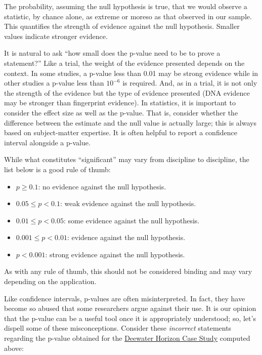 \documentclass[]{book}
\providecommand{\tightlist}{%
  \setlength{\itemsep}{0pt}\setlength{\parskip}{0pt}}
\theoremstyle{definition}
\theoremstyle{definition}
\theoremstyle{remark}
\let\BeginKnitrBlock\begin \let\EndKnitrBlock\end
\begin{document}
\BeginKnitrBlock{definition}[P-Value]
\protect\hypertarget{def:defn-pvalue}{}{\label{def:defn-pvalue}
{} }The probability, assuming the null hypothesis
is true, that we would observe a statistic, by chance alone, as extreme
or moreso as that observed in our sample. This quantifies the strength
of evidence against the null hypothesis. Smaller values indicate
stronger evidence.
\EndKnitrBlock{definition}

It is natural to ask ``how small does the p-value need to be to prove a
statement?'' Like a trial, the weight of the evidence presented depends
on the context. In some studies, a p-value less than 0.01 may be strong
evidence while in other studies a p-value less than \(10^{-6}\) is
required. And, as in a trial, it is not only the strength of the
evidence but the type of evidence presented (DNA evidence may be
stronger than fingerprint evidence). In statistics, it is important to
consider the effect size as well as the p-value. That is, consider
whether the difference between the estimate and the null value is
actually large; this is always based on subject-matter expertise. It is
often helpful to report a confidence interval alongside a p-value.

\BeginKnitrBlock{rmdtip}
While what constitutes ``significant'' may vary from discipline to
discipline, the list below is a good rule of thumb:

\begin{itemize}
\tightlist
\item
  \(p \geq 0.1\): no evidence against the null hypothesis.
\item
  \(0.05 \leq p < 0.1\): weak evidence against the null hypothesis.
\item
  \(0.01 \leq p < 0.05\): some evidence against the null hypothesis.
\item
  \(0.001 \leq p < 0.01\): evidence against the null hypothesis.
\item
  \(p < 0.001\): strong evidence against the null hypothesis.
\end{itemize}

As with any rule of thumb, this should not be considered binding and may
vary depending on the application.
\EndKnitrBlock{rmdtip}

Like confidence intervals, p-values are often misinterpreted. In fact,
they have become so abused that some researchers argue against their
use. It is our opinion that the p-value can be a useful tool once it is
appropriately understood; so, let's dispell some of these
misconceptions. Consider these \emph{incorrect} statements regarding the
p-value obtained for the \protect\hyperlink{CaseDeepwater}{Deewater
Horizon Case Study} computed above:
\end{document}
